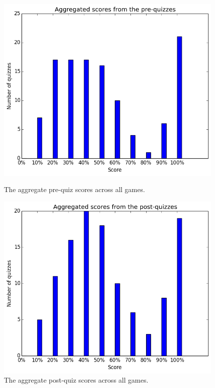 			\begin{figure}[h!] 
			\centering 
			\begin{minipage}[b]{0.45\linewidth}
			\includegraphics[height=0.33\textheight]{general_pre.png} 
			\caption{The aggregate pre-quiz scores across all games.}
			\end{minipage}
			\quad
			\begin{minipage}[b]{0.45\linewidth}
			\includegraphics[height=0.33\textheight]{general_post.png} 
			\caption{The aggregate post-quiz scores across all games.}
			\end{minipage}
			\end{figure}

